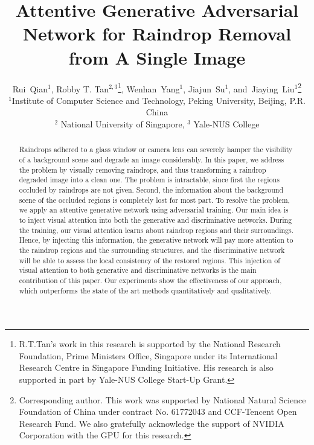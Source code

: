 \documentclass[10pt,twocolumn,letterpaper]{article}
\begin{document}
\title{Attentive Generative Adversarial Network for Raindrop Removal \\ from A Single Image}

\author{
	Rui~Qian$^1$,
	Robby T. Tan$^{2,3}$\thanks{R.T.Tan's work in this research is supported by the National Research Foundation, Prime Ministers Office, Singapore under its International Research Centre in Singapore Funding Initiative. His research is also supported in part by Yale-NUS College Start-Up Grant.}, 
	Wenhan~Yang$^1$,
	Jiajun~Su$^1$, 
	and~Jiaying~Liu$^1$\thanks{Corresponding author. This work was supported by National Natural Science Foundation of China under contract No. 61772043 and CCF-Tencent Open Research Fund. We also gratefully acknowledge the support of NVIDIA Corporation with the GPU for this research.}
	\\
	\small
	$^1$Institute of Computer Science and Technology, Peking University, Beijing, P.R. China
	\\
	\small
	$^2$ National University of Singapore,
	\small
	$^3$ Yale-NUS College	 
}

\maketitle
\thispagestyle{empty}

\begin{abstract}
Raindrops adhered to a glass window or camera lens can severely hamper the visibility of a background scene and degrade an image considerably. In this paper, we address the problem by visually removing raindrops, and thus transforming a raindrop degraded image into a clean one. The problem is intractable, since first the regions occluded by raindrops are not given. Second, the information about the background scene of the occluded regions is completely lost for most part. To resolve the problem, we apply an attentive generative network using adversarial training. Our main idea is to inject visual attention into both the generative and discriminative networks. During the training, our visual attention  learns about raindrop regions and their surroundings. Hence, by injecting this information, the generative network will pay more attention to the raindrop regions and the surrounding structures, and the discriminative network will be able to assess the local consistency of the restored regions. This injection of visual attention to both generative and discriminative networks is the main contribution of this paper. Our experiments show the effectiveness of our approach, which outperforms the state of the art methods quantitatively and qualitatively.
\end{abstract}
\end{document}
